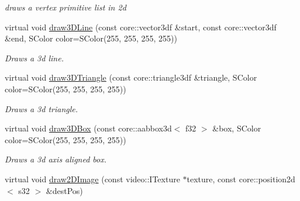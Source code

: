 \begin{DoxyCompactItemize}
\begin{DoxyCompactList}\small\item\em draws a vertex primitive list in 2d \end{DoxyCompactList}\item 
\hypertarget{classirr_1_1video_1_1_c_null_driver_aee951a3d9580d9f19c894fd49efe28ea}{virtual void \hyperlink{classirr_1_1video_1_1_c_null_driver_aee951a3d9580d9f19c894fd49efe28ea}{draw3\-D\-Line} (const core\-::vector3df \&start, const core\-::vector3df \&end, S\-Color color=S\-Color(255, 255, 255, 255))}\label{classirr_1_1video_1_1_c_null_driver_aee951a3d9580d9f19c894fd49efe28ea}

\begin{DoxyCompactList}\small\item\em Draws a 3d line. \end{DoxyCompactList}\item 
\hypertarget{classirr_1_1video_1_1_c_null_driver_a8e6575fa534ee1d4041fe9e08ac43f29}{virtual void \hyperlink{classirr_1_1video_1_1_c_null_driver_a8e6575fa534ee1d4041fe9e08ac43f29}{draw3\-D\-Triangle} (const core\-::triangle3df \&triangle, S\-Color color=S\-Color(255, 255, 255, 255))}\label{classirr_1_1video_1_1_c_null_driver_a8e6575fa534ee1d4041fe9e08ac43f29}

\begin{DoxyCompactList}\small\item\em Draws a 3d triangle. \end{DoxyCompactList}\item 
\hypertarget{classirr_1_1video_1_1_c_null_driver_a0b7c6e332cfe85c000d08f20cf8630ab}{virtual void \hyperlink{classirr_1_1video_1_1_c_null_driver_a0b7c6e332cfe85c000d08f20cf8630ab}{draw3\-D\-Box} (const core\-::aabbox3d$<$ f32 $>$ \&box, S\-Color color=S\-Color(255, 255, 255, 255))}\label{classirr_1_1video_1_1_c_null_driver_a0b7c6e332cfe85c000d08f20cf8630ab}

\begin{DoxyCompactList}\small\item\em Draws a 3d axis aligned box. \end{DoxyCompactList}\item 
\hypertarget{classirr_1_1video_1_1_c_null_driver_a5f6beba9be0e5ebb6de5affac3274958}{virtual void \hyperlink{classirr_1_1video_1_1_c_null_driver_a5f6beba9be0e5ebb6de5affac3274958}{draw2\-D\-Image} (const video\-::\-I\-Texture $\ast$texture, const core\-::position2d$<$ s32 $>$ \&dest\-Pos)}\label{classirr_1_1video_1_1_c_null_driver_a5f6beba9be0e5ebb6de5affac3274958}


\end{DoxyCompactItemize}
